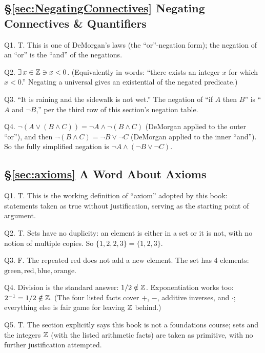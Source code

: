 \subsection*{\S\ref{sec:NegatingConnectives} Negating Connectives \& Quantifiers}
\hypertarget{a:ch0:negations}{}
\noindent Q1. T. This is one of DeMorgan's laws (the ``or''-negation form); the negation of an ``or'' is the ``and'' of the negations.\par\smallskip
\noindent Q2. $\exists \, x \in {\mathbb{Z}} \ni x < 0$. (Equivalently in words: ``there exists an integer $x$ for which $x < 0$.'' Negating a universal gives an existential of the negated predicate.)\par\smallskip
\noindent Q3. ``It is raining and the sidewalk is not wet.'' The negation of ``if $A$ then $B$'' is ``$A$ and $\lnot B$,'' per the third row of this section's negation table.\par\smallskip
\noindent Q4. $\lnot(A \lor (B \land C)) = \lnot A \land \lnot(B \land C)$ (DeMorgan applied to the outer ``or''), and then $\lnot(B \land C) = \lnot B \lor \lnot C$ (DeMorgan applied to the inner ``and''). So the fully simplified negation is $\lnot A \land (\lnot B \lor \lnot C)$.\par\smallskip
\hfill{}\par\medskip

\subsection*{\S\ref{sec:axioms} A Word About Axioms}
\hypertarget{a:ch0:axioms}{}
\noindent Q1. T. This is the working definition of ``axiom'' adopted by this book: statements taken as true without justification, serving as the starting point of argument.\par\smallskip
\noindent Q2. T. Sets have no duplicity: an element is either in a set or it is not, with no notion of multiple copies. So $\{1,2,2,3\} = \{1,2,3\}$.\par\smallskip
\noindent Q3. F. The repeated $\text{red}$ does not add a new element. The set has 4 elements: $\text{green}, \text{red}, \text{blue}, \text{orange}$.\par\smallskip
\noindent Q4. Division is the standard answer: $1 / 2 \notin {\mathbb{Z}}$. Exponentiation works too: $2^{-1} = 1/2 \notin {\mathbb{Z}}$. (The four listed facts cover $+$, $-$, additive inverses, and $\cdot$; everything else is fair game for leaving ${\mathbb{Z}}$ behind.)\par\smallskip
\noindent Q5. T. The section explicitly says this book is not a foundations course; sets and the integers ${\mathbb{Z}}$ (with the listed arithmetic facts) are taken as primitive, with no further justification attempted.\par\smallskip
\hfill{}\par\medskip

